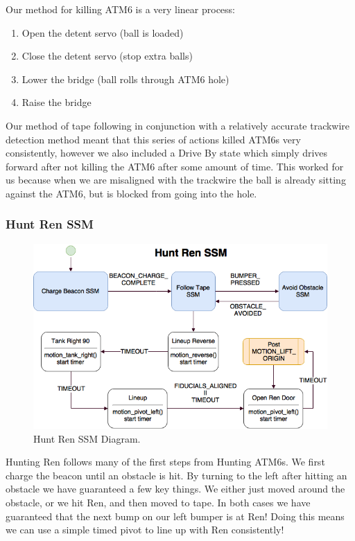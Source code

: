 \documentclass[]{article}
\begin{document}
Our method for killing ATM6 is a very linear process:
\begin{enumerate}
    \item Open the detent servo (ball is loaded)
    \item Close the detent servo (stop extra balls)
    \item Lower the bridge (ball rolls through ATM6 hole)
    \item Raise the bridge
\end{enumerate}

Our method of tape following in conjunction with a relatively accurate trackwire detection method meant that this series of actions killed ATM6s very consistently, however we also included a Drive By state which simply drives forward after not killing the ATM6 after some amount of time. This worked for us because when we are misaligned with the trackwire the ball is already sitting against the ATM6, but is blocked from going into the hole.

\subsubsection{Hunt Ren SSM} \label{sec: hunt ren}
\begin{figure}[H]
    \centering
    \includegraphics[scale=0.60]{hunt-ren-ssm.png}
    \caption{Hunt Ren SSM Diagram.}
    \label{fig: Hunt Ren ssm}
\end{figure}

Hunting Ren follows many of the first steps from Hunting ATM6s. We first charge the beacon until an obstacle is hit. By turning to the left after hitting an obstacle we have guaranteed a few key things. We either just moved around the obstacle, or we hit Ren, and then moved to tape. In both cases we have guaranteed that the next bump on our left bumper is at Ren! Doing this means we can use a simple timed pivot to line up with Ren consistently!
\end{document}
